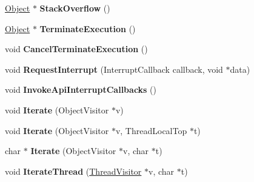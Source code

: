 \begin{DoxyCompactItemize}
\item 
\hyperlink{classv8_1_1internal_1_1_object}{Object} $\ast$ {\bfseries Stack\+Overflow} ()\hypertarget{classv8_1_1internal_1_1_isolate_aed0b4300eaf251291dadf3c93a8e507f}{}\label{classv8_1_1internal_1_1_isolate_aed0b4300eaf251291dadf3c93a8e507f}

\item 
\hyperlink{classv8_1_1internal_1_1_object}{Object} $\ast$ {\bfseries Terminate\+Execution} ()\hypertarget{classv8_1_1internal_1_1_isolate_a2e2c918ec2e8fa0efa312cff1306057a}{}\label{classv8_1_1internal_1_1_isolate_a2e2c918ec2e8fa0efa312cff1306057a}

\item 
void {\bfseries Cancel\+Terminate\+Execution} ()\hypertarget{classv8_1_1internal_1_1_isolate_a5cb7af73c1baa2d1036c632bf48c1a6a}{}\label{classv8_1_1internal_1_1_isolate_a5cb7af73c1baa2d1036c632bf48c1a6a}

\item 
void {\bfseries Request\+Interrupt} (Interrupt\+Callback callback, void $\ast$data)\hypertarget{classv8_1_1internal_1_1_isolate_a26b7bce2682f35560d3bd02cb4f68a3f}{}\label{classv8_1_1internal_1_1_isolate_a26b7bce2682f35560d3bd02cb4f68a3f}

\item 
void {\bfseries Invoke\+Api\+Interrupt\+Callbacks} ()\hypertarget{classv8_1_1internal_1_1_isolate_a7161bf0edcf0d50800d5f3e5c7ea8d6b}{}\label{classv8_1_1internal_1_1_isolate_a7161bf0edcf0d50800d5f3e5c7ea8d6b}

\item 
void {\bfseries Iterate} (Object\+Visitor $\ast$v)\hypertarget{classv8_1_1internal_1_1_isolate_a858eb3b0ac0ee5d221bd6b0b72d0a4fd}{}\label{classv8_1_1internal_1_1_isolate_a858eb3b0ac0ee5d221bd6b0b72d0a4fd}

\item 
void {\bfseries Iterate} (Object\+Visitor $\ast$v, Thread\+Local\+Top $\ast$t)\hypertarget{classv8_1_1internal_1_1_isolate_aafa86eacb568c9a854e14bbd94383d7a}{}\label{classv8_1_1internal_1_1_isolate_aafa86eacb568c9a854e14bbd94383d7a}

\item 
char $\ast$ {\bfseries Iterate} (Object\+Visitor $\ast$v, char $\ast$t)\hypertarget{classv8_1_1internal_1_1_isolate_ae6f302d4450cdbc16ebc0e4edff8d2cf}{}\label{classv8_1_1internal_1_1_isolate_ae6f302d4450cdbc16ebc0e4edff8d2cf}

\item 
void {\bfseries Iterate\+Thread} (\hyperlink{classv8_1_1internal_1_1_thread_visitor}{Thread\+Visitor} $\ast$v, char $\ast$t)\hypertarget{classv8_1_1internal_1_1_isolate_a7bad9f07a0b0ef64f863ed73426c5f3c}{}\label{classv8_1_1internal_1_1_isolate_a7bad9f07a0b0ef64f863ed73426c5f3c}


\end{DoxyCompactItemize}
